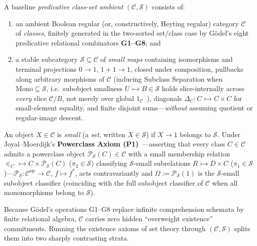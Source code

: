 \begin{definition}\label{def:small-map-ambient}%
%
A baseline \emph{predicative class-set ambient} $(\mathcal{C}, \mathcal{S})$ consists of:
\begin{enumerate}[label=\textup{(\roman*)},leftmargin=1.8em]
  \item an ambient Boolean regular (or, constructively, Heyting regular) category $\mathcal{C}$ of \emph{classes}, finitely generated in the two-sorted set/class case by G\"odel's eight predicative relational combinators \textbf{G1--G8}; and
  \item a stable subcategory $\mathcal{S} \subseteq \mathcal{C}$ of \emph{small maps} containing isomorphisms and terminal projections $0 \to 1$, $1 + 1 \to 1$, closed under composition, pullbacks along arbitrary morphisms of $\mathcal{C}$ (inducing Subclass Separation when $\mathrm{Mono} \subseteq \mathcal{S}$, i.e.\ subobject smallness $U \rightarrowtail B \in \mathcal{S}$ holds slice-internally across \emph{every} slice $\mathcal{C}/B$, not merely over global $1_{\mathcal{C}}$~\cite[\S I.1]{JoyalMoerdijk95}), diagonals $\Delta_C : C \rightarrowtail C \times C$ for small-element equality, and finite disjoint sums---\emph{without} assuming quotient or regular-image descent.
\end{enumerate}
An object $X \in \mathcal{C}$ is \emph{small} (a \emph{set}, written $X \in \mathcal{S}$) if $X \to 1$ belongs to $\mathcal{S}$. Under Joyal--Moerdijk's \textbf{Powerclass Axiom (P1)}~\cite[\S I.1]{JoyalMoerdijk95}---asserting that every class $C \in \mathcal{C}$ admits a powerclass object $\mathcal{P}_{\mathcal{S}}(C) \in \mathcal{C}$ with a small membership relation $\in_C \rightarrowtail C \times \mathcal{P}_{\mathcal{S}}(C)$ ($\pi_2 \in \mathcal{S}$) classifying $\mathcal{S}$-small subrelations $R \rightarrowtail D \times C$ ($\pi_1 \in \mathcal{S}$)---$\mathcal{P}_{\mathcal{S}} : \mathcal{C}^{\mathrm{op}} \to \mathcal{C}$, $f \mapsto f^*$, acts contravariantly and $\Omega := \mathcal{P}_{\mathcal{S}}(1)$ is the $\mathcal{S}$-small subobject classifier (coinciding with the full subobject classifier of $\mathcal{C}$ when all monomorphisms belong to $\mathcal{S}$).
\end{definition}

Because G\"odel's operations G1--G8 replace infinite comprehension schemata by finite relational algebra, $\mathcal{C}$ carries zero hidden ``overweight existence'' commitments. Running the existence axioms of set theory through $(\mathcal{C}, \mathcal{S})$ splits them into two sharply contrasting strata.

